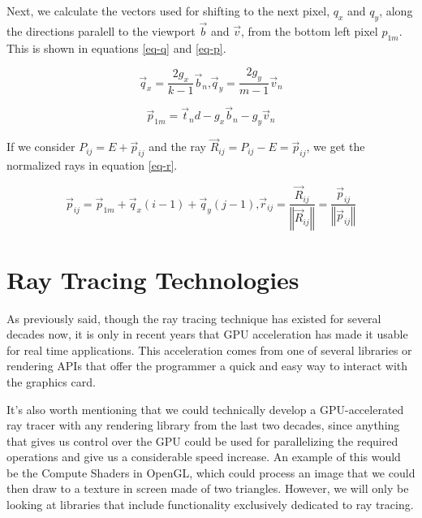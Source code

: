 Next, we calculate the vectors used for shifting to the next pixel, $q_x$ and $q_y$, along the directions paralell to the viewport $\overrightarrow{b}$ and $\overrightarrow{v}$, from the bottom left pixel $p_{1m}$. This is shown in equations \ref{eq-q} and \ref{eq-p}.

\begin{equation}
  \overrightarrow{q}_x = \frac{2g_x}{k-1} \overrightarrow{b}_n
  \text{,}
  \overrightarrow{q}_y = \frac{2g_y}{m-1} \overrightarrow{v}_n
  \label{eq-q}
\end{equation}

\begin{equation}
  \overrightarrow{p}_{1m} = \overrightarrow{t}_n d - g_x \overrightarrow{b}_n - g_y \overrightarrow{v}_n
  \label{eq-p}
\end{equation}

If we consider $P_{ij} = E + \overrightarrow{p}_{ij}$ and the ray $\overrightarrow{R}_{ij} = P_{ij} - E = \overrightarrow{p}_{ij}$, we get the normalized rays in equation \ref{eq-r}.

\begin{equation}
  \overrightarrow{p}_{ij} = \overrightarrow{p}_{1m} + \overrightarrow{q}_x(i - 1) + \overrightarrow{q}_y(j - 1)
  \text{,}
  \overrightarrow{r}_{ij} = \frac{\overrightarrow{R}_{ij}}{\left\Vert \overrightarrow{R}_{ij} \right\Vert} = \frac{\overrightarrow{p}_{ij}}{\left\Vert \overrightarrow{p}_{ij} \right\Vert}
  \label{eq-r}
\end{equation}

\section{Ray Tracing Technologies}
As previously said, though the ray tracing technique has existed for several decades now, it is only in recent years that GPU acceleration has made it usable for real time applications. This acceleration comes from one of several libraries or rendering APIs that offer the programmer a quick and easy way to interact with the graphics card.

It's also worth mentioning that we could technically develop a GPU-accelerated ray tracer with any rendering library from the last two decades, since anything that gives us control over the GPU could be used for parallelizing the required operations and give us a considerable speed increase. An example of this would be the Compute Shaders in OpenGL, which could process an image that we could then draw to a texture in screen made of two triangles. However, we will only be looking at libraries that include functionality exclusively dedicated to ray tracing.

